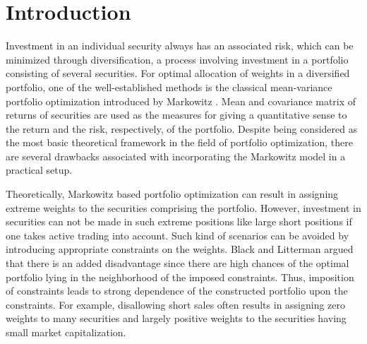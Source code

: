 \chapter{Introduction}

Investment in an individual security always has an associated risk, which can be minimized through diversification, a process involving  investment in a portfolio consisting of several securities. For optimal allocation of weights in a diversified portfolio, one of the well-established methods is the classical mean-variance portfolio optimization introduced by Markowitz \cite{Markowitz1,Markowitz2}. Mean and covariance matrix of returns of securities are used as the measures for giving a quantitative sense to the return and the risk, respectively, of the portfolio. Despite being considered as the most basic theoretical framework in the field of portfolio optimization, there are several drawbacks associated with incorporating the Markowitz model in a practical setup.


Theoretically, Markowitz based portfolio optimization can result in assigning extreme weights to the securities comprising the portfolio. However, investment in securities can not be made in such extreme positions like large short positions if one takes active trading into account. Such kind of scenarios can be avoided by introducing appropriate constraints on the weights.  Black and Litterman \cite{Black} argued that there is an added disadvantage since there are high chances of the optimal portfolio lying in the neighborhood of the imposed constraints. Thus, imposition of constraints leads to strong dependence of the constructed portfolio upon the constraints. For example, disallowing short sales often results in assigning zero weights to many securities and largely positive weights to the securities having small market capitalization. 

